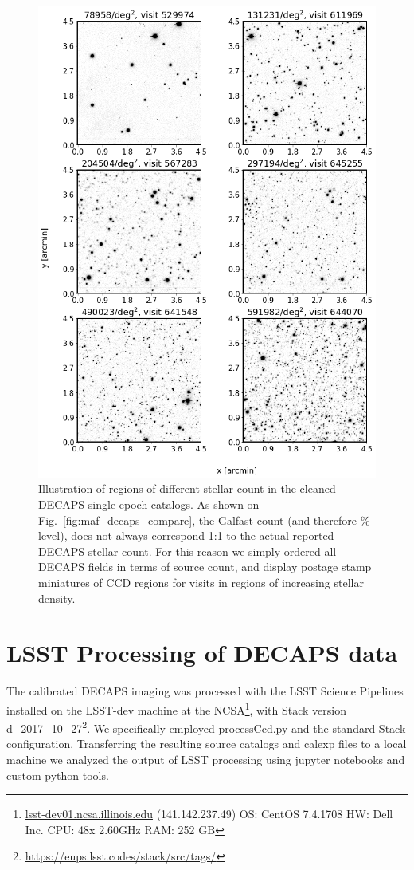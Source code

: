 \documentclass[DM,lsstdraft,toc,usenatbib]{lsstdoc}
\begin{document}
\begin{figure}
\begin{centering}
\includegraphics[width=0.85\columnwidth]{figs/Illustrate_densities_DECAPS.png}
\caption{Illustration of regions of different stellar count in the cleaned DECAPS single-epoch catalogs. As shown on Fig.~\ref{fig:maf_decaps_compare}, the Galfast count (and therefore \% level), does not always correspond 1:1 to the actual reported DECAPS stellar count. For this reason we simply ordered all DECAPS fields in terms of source count, and display postage stamp miniatures of CCD regions for visits in regions of increasing stellar density. }
\label{fig:decaps_illustrate_densities}
\end{centering}
\end{figure} 


\section{LSST Processing of DECAPS data}
\label{sec:LSST}
The calibrated DECAPS imaging was processed with the LSST Science Pipelines installed on the LSST-dev machine at the NCSA\footnote{\url{lsst-dev01.ncsa.illinois.edu} (141.142.237.49) OS: CentOS 7.4.1708   HW: Dell Inc. CPU: 48x 2.60GHz RAM: 252 GB}, with Stack version d\_2017\_10\_27\footnote{\url{https://eups.lsst.codes/stack/src/tags/}}.  We specifically employed processCcd.py and the standard Stack configuration. Transferring the resulting source catalogs and calexp files to a local machine we analyzed the output of LSST processing using jupyter notebooks and custom python tools. 
\end{document}
